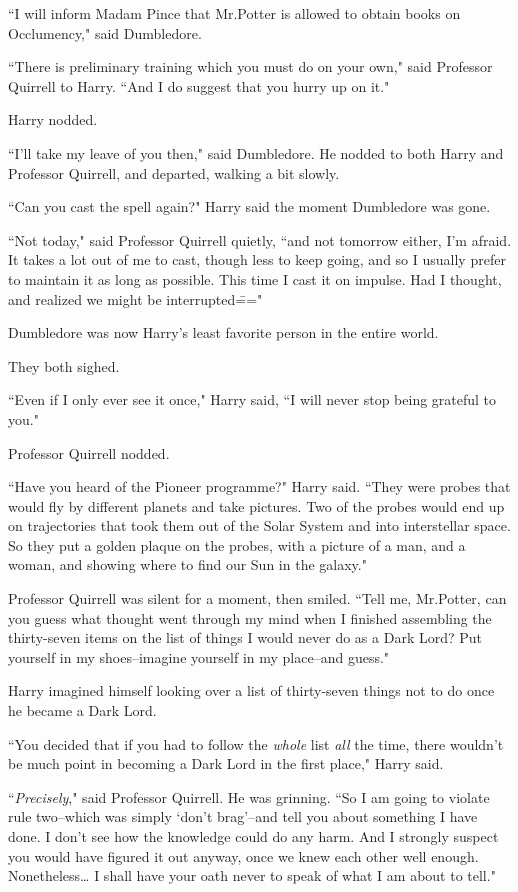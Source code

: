 ``I will inform Madam Pince that Mr.\?Potter is allowed to obtain books on Occlumency," said Dumbledore.

``There is preliminary training which you must do on your own," said Professor Quirrell to Harry. ``And I do suggest that you hurry up on it."

Harry nodded.

``I'll take my leave of you then," said Dumbledore. He nodded to both Harry and Professor Quirrell, and departed, walking a bit slowly.

``Can you cast the spell again?" Harry said the moment Dumbledore was gone.

``Not today," said Professor Quirrell quietly, ``and not tomorrow either, I'm afraid. It takes a lot out of me to cast, though less to keep going, and so I usually prefer to maintain it as long as possible. This time I cast it on impulse. Had I thought, and realized we might be interrupted\==="

Dumbledore was now Harry's least favorite person in the entire world.

They both sighed.

``Even if I only ever see it once," Harry said, ``I will never stop being grateful to you."

Professor Quirrell nodded.

``Have you heard of the Pioneer programme?" Harry said. ``They were probes that would fly by different planets and take pictures. Two of the probes would end up on trajectories that took them out of the Solar System and into interstellar space. So they put a golden plaque on the probes, with a picture of a man, and a woman, and showing where to find our Sun in the galaxy."

Professor Quirrell was silent for a moment, then smiled. ``Tell me, Mr.\?Potter, can you guess what thought went through my mind when I finished assembling the thirty-seven items on the list of things I would never do as a Dark Lord? Put yourself in my shoes\---imagine yourself in my place\---and guess."

Harry imagined himself looking over a list of thirty-seven things not to do once he became a Dark Lord.

``You decided that if you had to follow the \emph{whole} list \emph{all} the time, there wouldn't be much point in becoming a Dark Lord in the first place," Harry said.

``\emph{Precisely}," said Professor Quirrell. He was grinning. ``So I am going to violate rule two\---which was simply `don't brag'\---and tell you about something I have done. I don't see how the knowledge could do any harm. And I strongly suspect you would have figured it out anyway, once we knew each other well enough. Nonetheless{\ldots} I shall have your oath never to speak of what I am about to tell."

